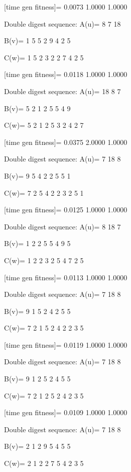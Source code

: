 [time gen fitness]=
    0.0073    1.0000    1.0000

Double digest sequence:
A(u)=
     8     7    18

B(v)=
     1     5     5     2     9     4     2     5

C(w)=
     1     5     2     3     2     2     7     4     2     5

[time gen fitness]=
    0.0118    1.0000    1.0000

Double digest sequence:
A(u)=
    18     8     7

B(v)=
     5     2     1     2     5     5     4     9

C(w)=
     5     2     1     2     5     3     2     4     2     7

[time gen fitness]=
    0.0375    2.0000    1.0000

Double digest sequence:
A(u)=
     7    18     8

B(v)=
     9     5     4     2     2     5     5     1

C(w)=
     7     2     5     4     2     2     3     2     5     1

[time gen fitness]=
    0.0125    1.0000    1.0000

Double digest sequence:
A(u)=
     8    18     7

B(v)=
     1     2     2     5     5     4     9     5

C(w)=
     1     2     2     3     2     5     4     7     2     5

[time gen fitness]=
    0.0113    1.0000    1.0000

Double digest sequence:
A(u)=
     7    18     8

B(v)=
     9     1     5     2     4     2     5     5

C(w)=
     7     2     1     5     2     4     2     2     3     5

[time gen fitness]=
    0.0119    1.0000    1.0000

Double digest sequence:
A(u)=
     7    18     8

B(v)=
     9     1     2     5     2     4     5     5

C(w)=
     7     2     1     2     5     2     4     2     3     5

[time gen fitness]=
    0.0109    1.0000    1.0000

Double digest sequence:
A(u)=
     7    18     8

B(v)=
     2     1     2     9     5     4     5     5

C(w)=
     2     1     2     2     7     5     4     2     3     5

